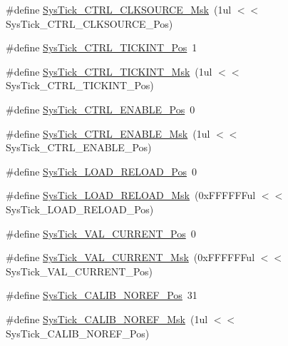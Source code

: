 \begin{DoxyCompactItemize}
\item 
\#define \hyperlink{group___c_m_s_i_s___c_m3___sys_tick_gaa41d06039797423a46596bd313d57373}{Sys\-Tick\-\_\-\-C\-T\-R\-L\-\_\-\-C\-L\-K\-S\-O\-U\-R\-C\-E\-\_\-\-Msk}~(1ul $<$$<$ Sys\-Tick\-\_\-\-C\-T\-R\-L\-\_\-\-C\-L\-K\-S\-O\-U\-R\-C\-E\-\_\-\-Pos)
\item 
\#define \hyperlink{group___c_m_s_i_s___c_m3___sys_tick_ga88f45bbb89ce8df3cd2b2613c7b48214}{Sys\-Tick\-\_\-\-C\-T\-R\-L\-\_\-\-T\-I\-C\-K\-I\-N\-T\-\_\-\-Pos}~1
\item 
\#define \hyperlink{group___c_m_s_i_s___c_m3___sys_tick_ga95bb984266ca764024836a870238a027}{Sys\-Tick\-\_\-\-C\-T\-R\-L\-\_\-\-T\-I\-C\-K\-I\-N\-T\-\_\-\-Msk}~(1ul $<$$<$ Sys\-Tick\-\_\-\-C\-T\-R\-L\-\_\-\-T\-I\-C\-K\-I\-N\-T\-\_\-\-Pos)
\item 
\#define \hyperlink{group___c_m_s_i_s___c_m3___sys_tick_ga0b48cc1e36d92a92e4bf632890314810}{Sys\-Tick\-\_\-\-C\-T\-R\-L\-\_\-\-E\-N\-A\-B\-L\-E\-\_\-\-Pos}~0
\item 
\#define \hyperlink{group___c_m_s_i_s___c_m3___sys_tick_ga16c9fee0ed0235524bdeb38af328fd1f}{Sys\-Tick\-\_\-\-C\-T\-R\-L\-\_\-\-E\-N\-A\-B\-L\-E\-\_\-\-Msk}~(1ul $<$$<$ Sys\-Tick\-\_\-\-C\-T\-R\-L\-\_\-\-E\-N\-A\-B\-L\-E\-\_\-\-Pos)
\item 
\#define \hyperlink{group___c_m_s_i_s___c_m3___sys_tick_gaf44d10df359dc5bf5752b0894ae3bad2}{Sys\-Tick\-\_\-\-L\-O\-A\-D\-\_\-\-R\-E\-L\-O\-A\-D\-\_\-\-Pos}~0
\item 
\#define \hyperlink{group___c_m_s_i_s___c_m3___sys_tick_ga265912a7962f0e1abd170336e579b1b1}{Sys\-Tick\-\_\-\-L\-O\-A\-D\-\_\-\-R\-E\-L\-O\-A\-D\-\_\-\-Msk}~(0x\-F\-F\-F\-F\-F\-Ful $<$$<$ Sys\-Tick\-\_\-\-L\-O\-A\-D\-\_\-\-R\-E\-L\-O\-A\-D\-\_\-\-Pos)
\item 
\#define \hyperlink{group___c_m_s_i_s___c_m3___sys_tick_ga3208104c3b019b5de35ae8c21d5c34dd}{Sys\-Tick\-\_\-\-V\-A\-L\-\_\-\-C\-U\-R\-R\-E\-N\-T\-\_\-\-Pos}~0
\item 
\#define \hyperlink{group___c_m_s_i_s___c_m3___sys_tick_gafc77b56d568930b49a2474debc75ab45}{Sys\-Tick\-\_\-\-V\-A\-L\-\_\-\-C\-U\-R\-R\-E\-N\-T\-\_\-\-Msk}~(0x\-F\-F\-F\-F\-F\-Ful $<$$<$ Sys\-Tick\-\_\-\-V\-A\-L\-\_\-\-C\-U\-R\-R\-E\-N\-T\-\_\-\-Pos)
\item 
\#define \hyperlink{group___c_m_s_i_s___c_m3___sys_tick_ga534dbe414e7a46a6ce4c1eca1fbff409}{Sys\-Tick\-\_\-\-C\-A\-L\-I\-B\-\_\-\-N\-O\-R\-E\-F\-\_\-\-Pos}~31
\item 
\#define \hyperlink{group___c_m_s_i_s___c_m3___sys_tick_ga3af0d891fdd99bcc8d8912d37830edb6}{Sys\-Tick\-\_\-\-C\-A\-L\-I\-B\-\_\-\-N\-O\-R\-E\-F\-\_\-\-Msk}~(1ul $<$$<$ Sys\-Tick\-\_\-\-C\-A\-L\-I\-B\-\_\-\-N\-O\-R\-E\-F\-\_\-\-Pos)

\end{DoxyCompactItemize}

